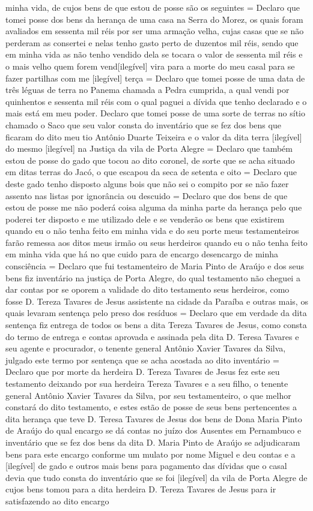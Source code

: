 \begin{refsection}
minha vida, de cujos bens de que estou de posse são os seguintes = Declaro que tomei posse dos bens da herança de uma casa na Serra do Morez, os quais foram avaliados em sessenta mil réis por ser uma armação velha, cujas casas que se não perderam as consertei e nelas tenho gasto perto de duzentos mil réis, sendo que em minha vida as não tenho vendido dela se tocara o valor de sessenta mil réis e o mais velho quem forem vend[ilegível] vira para a morte do meu casal para se fazer partilhas com me [ilegível] terça  = Declaro que tomei posse de uma data de três léguas de terra no Panema chamada a Pedra cumprida, a qual vendi por quinhentos e sessenta mil réis com o qual paguei a dívida que tenho declarado e o mais está em meu poder. Declaro que tomei posse de uma sorte de terras no sítio chamado o Saco que seu valor consta do inventário que se fez dos bens que ficaram do dito meu tio Antônio Duarte Teixeira e o valor da dita terra [ilegível] do mesmo [ilegível] na Justiça da vila de Porta Alegre = Declaro que também estou de posse do gado que tocou ao dito coronel, de sorte que se acha situado em ditas terras do Jacó, o que escapou da seca de setenta e oito = Declaro que deste gado tenho disposto alguns bois que não sei o compito por se não fazer assento nas listas por ignorância ou descuido = Declaro que dos bens de que estou de posse me não poderá coisa alguma da minha parte da herança pelo que poderei ter disposto e me utilizado dele e se venderão os bens que existirem quando eu o não tenha feito em minha vida e do seu porte meus testamenteiros farão remessa aos ditos meus irmão ou seus herdeiros quando eu o não tenha feito em minha vida que há no que cuido para de encargo desencargo de minha consciência = Declaro que fui testamenteiro de Maria Pinto de Araújo e dos seus bens fiz inventário na justiça de Porta Alegre, do qual testamento não cheguei a dar contas por se oporem a validade do dito testamento seus herdeiros, como fosse D. Tereza Tavares de Jesus assistente na cidade da Paraíba e outras mais, os quais levaram sentença pelo preso dos resíduos = Declaro que em verdade da dita sentença fiz entrega de todos os bens a dita Tereza Tavares de Jesus, como consta do termo de entrega e contas aprovada e assinada pela dita D. Teresa Tavares e seu agente e procurador, o tenente general Antônio Xavier Tavares da Silva, julgado este termo por sentença que se acha acostada ao dito inventário = Declaro que por morte da herdeira D. Tereza Tavares de Jesus fez este seu testamento deixando por sua herdeira Tereza Tavares e a seu filho, o tenente general Antônio Xavier Tavares da Silva, por seu testamenteiro, o que melhor constará do dito testamento, e estes estão de posse de seus bens pertencentes a dita herança que teve D. Teresa Tavares de Jesus dos bens de Dona Maria Pinto de Araújo do qual encargo se dá contas no juízo dos Ausentes em Pernambuco e inventário que se fez dos bens da dita D. Maria Pinto de Araújo se adjudicaram bens para este encargo conforme um mulato por nome Miguel e deu contas e a [ilegível] de gado e outros mais bens para pagamento das dívidas que o casal devia que tudo consta do inventário que se foi [ilegível] da vila de Porta Alegre de cujos bens tomou para a dita herdeira D. Tereza Tavares de Jesus para ir satisfazendo ao dito encargo 
\end{refsection}
